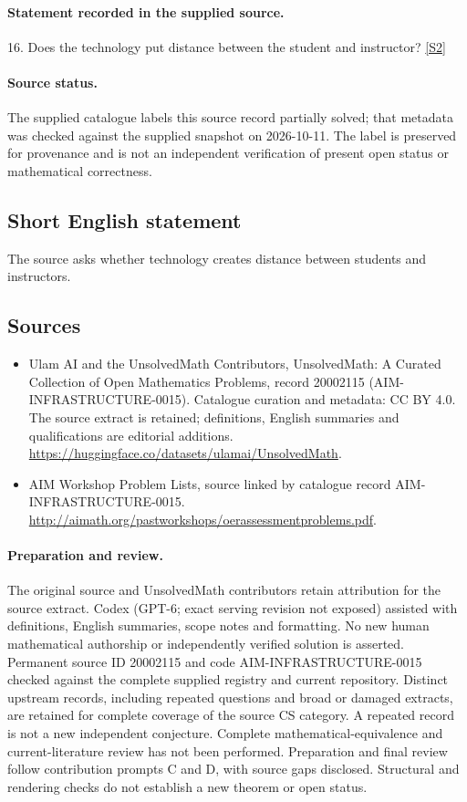 \documentclass[11pt]{article}
\begin{document}
\paragraph{Statement recorded in the supplied source.}
16. Does the technology put distance between the student and instructor? \href{http://aimath.org/pastworkshops/oerassessmentproblems.pdf}{[S2]}
\paragraph{Source status.}
The supplied catalogue labels this source record partially solved; that metadata was checked against the supplied snapshot on 2026-10-11. The label is preserved for provenance and is not an independent verification of present open status or mathematical correctness.
\subsection{Short English statement}
The source asks whether technology creates distance between students and instructors.
\subsection{Sources}
\begin{itemize}
\item[S1] Ulam AI and the UnsolvedMath Contributors, UnsolvedMath: A Curated Collection of Open Mathematics Problems, record 20002115 (AIM-INFRASTRUCTURE-0015). Catalogue curation and metadata: CC BY 4.0. The source extract is retained; definitions, English summaries and qualifications are editorial additions.
\url{https://huggingface.co/datasets/ulamai/UnsolvedMath}.
\item[S2] AIM Workshop Problem Lists, source linked by catalogue record AIM-INFRASTRUCTURE-0015.
\url{http://aimath.org/pastworkshops/oerassessmentproblems.pdf}.
\end{itemize}
\paragraph{Preparation and review.}
The original source and UnsolvedMath contributors retain attribution for the source extract. Codex (GPT-6; exact serving revision not exposed) assisted with definitions, English summaries, scope notes and formatting. No new human mathematical authorship or independently verified solution is asserted. Permanent source ID 20002115 and code AIM-INFRASTRUCTURE-0015 checked against the complete supplied registry and current repository. Distinct upstream records, including repeated questions and broad or damaged extracts, are retained for complete coverage of the source CS category. A repeated record is not a new independent conjecture. Complete mathematical-equivalence and current-literature review has not been performed. Preparation and final review follow contribution prompts C and D, with source gaps disclosed. Structural and rendering checks do not establish a new theorem or open status.
\label{end:20002115}
\end{document}
